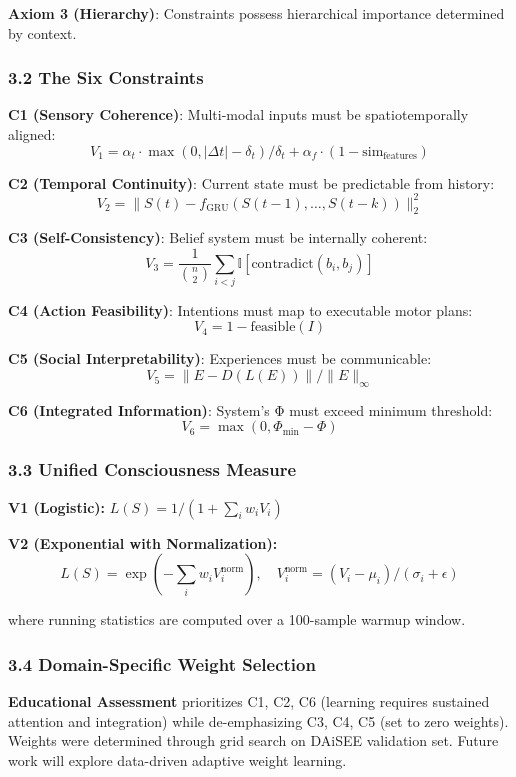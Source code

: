 \documentclass[
]{article}
\begin{document}
\textbf{Axiom 3 (Hierarchy)}: Constraints possess hierarchical
importance determined by context.

\subsubsection{3.2 The Six Constraints}\label{the-six-constraints}

\textbf{C1 (Sensory Coherence)}: Multi-modal inputs must be
spatiotemporally aligned:
\[V_1 = \alpha_t \cdot \max(0, |\Delta t| - \delta_t)/\delta_t + \alpha_f \cdot (1 - \text{sim}_{\text{features}})\]

\textbf{C2 (Temporal Continuity)}: Current state must be predictable
from history:
\[V_2 = \|S(t) - f_{\text{GRU}}(S(t-1), \ldots, S(t-k))\|_2^2\]

\textbf{C3 (Self-Consistency)}: Belief system must be internally
coherent:
\[V_3 = \frac{1}{\binom{n}{2}} \sum_{i<j} \mathbb{I}[\text{contradict}(b_i, b_j)]\]

\textbf{C4 (Action Feasibility)}: Intentions must map to executable
motor plans: \[V_4 = 1 - \text{feasible}(I)\]

\textbf{C5 (Social Interpretability)}: Experiences must be communicable:
\[V_5 = \|E - D(L(E))\| / \|E\|_\infty\]

\textbf{C6 (Integrated Information)}: System's Φ must exceed minimum
threshold: \[V_6 = \max(0, \Phi_{\min} - \Phi)\]

\subsubsection{3.3 Unified Consciousness
Measure}\label{unified-consciousness-measure}

\textbf{V1 (Logistic):} \(L(S) = 1/(1 + \sum_i w_i V_i)\)

\textbf{V2 (Exponential with Normalization):}
\[L(S) = \exp\left(-\sum_i w_i V_i^{\text{norm}}\right), \quad V_i^{\text{norm}} = (V_i - \mu_i)/(\sigma_i + \epsilon)\]

where running statistics are computed over a 100-sample warmup window.

\subsubsection{3.4 Domain-Specific Weight
Selection}\label{domain-specific-weight-selection}

\textbf{Educational Assessment} prioritizes C1, C2, C6 (learning
requires sustained attention and integration) while de-emphasizing C3,
C4, C5 (set to zero weights). Weights were determined through grid
search on DAiSEE validation set. Future work will explore data-driven
adaptive weight learning.
\end{document}
